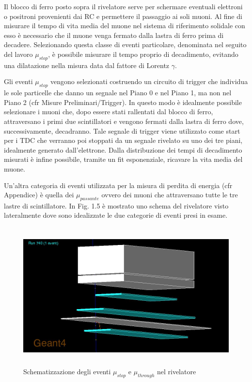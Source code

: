 \documentclass{standalone}
\begin{document}
Il blocco di ferro posto sopra il rivelatore serve per schermare eventuali elettroni o positroni provenienti dai RC e permettere il passaggio ai soli muoni.
Al fine di misurare il tempo di vita media del muone nel sistema di riferimento solidale con esso è necessario che il muone venga fermato dalla lastra di ferro prima di decadere. Selezionando questa classe di eventi particolare, denominata nel seguito del lavoro $\mu_{stop}$, è possibile misurare il tempo proprio di decadimento, evitando una dilatazione nella misura data dal fattore di Lorentz $\gamma$.

Gli eventi $\mu_{stop}$ vengono selezionati costruendo un circuito di trigger che individua le sole particelle che danno un segnale nel Piano 0 e nel Piano 1, ma non nel Piano 2 (cfr Misure Preliminari/Trigger). In questo modo è idealmente possibile selezionare i muoni che, dopo essere stati rallentati dal blocco di ferro, attraversano i primi due scintillatori e vengono fermati dalla lastra di ferro dove, successivamente, decadranno.
Tale segnale di trigger viene utilizzato come start per i TDC che verranno poi stoppati da un segnale rivelato su uno dei tre piani, idealmente generato dall'elettrone. Dalla distribuzione dei tempi di decadimento misurati è infine possibile, tramite un fit esponenziale, ricavare la vita media del muone.

Un'altra categoria di eventi utilizzata per la misura di perdita di energia (cfr Appendice) è quella dei $\mu_{passante}$ ovvero dei muoni che attraversano tutte le tre lastre di scintillatore. In Fig. 1.5 è mostrato uno schema del rivelatore visto lateralmente dove sono idealizzate le due categorie di eventi presi in esame.

\begin{figure}[H]
	\centering
  \includegraphics[width=13cm, height=7.5cm]{images/mu_stop.jpg}
	\caption{Schematizzazione degli eventi $\mu_{stop}$ e $\mu_{through}$ nel rivelatore}
\end{figure}
\end{document}
